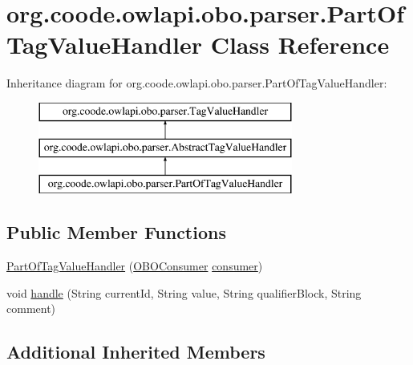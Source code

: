\hypertarget{classorg_1_1coode_1_1owlapi_1_1obo_1_1parser_1_1_part_of_tag_value_handler}{\section{org.\-coode.\-owlapi.\-obo.\-parser.\-Part\-Of\-Tag\-Value\-Handler Class Reference}
\label{classorg_1_1coode_1_1owlapi_1_1obo_1_1parser_1_1_part_of_tag_value_handler}
}
Inheritance diagram for org.\-coode.\-owlapi.\-obo.\-parser.\-Part\-Of\-Tag\-Value\-Handler\-:\begin{figure}[H]
\begin{center}
\leavevmode
\includegraphics[height=3.000000cm]{classorg_1_1coode_1_1owlapi_1_1obo_1_1parser_1_1_part_of_tag_value_handler}
\end{center}
\end{figure}
\subsection*{Public Member Functions}
\begin{DoxyCompactItemize}
\item 
\hyperlink{classorg_1_1coode_1_1owlapi_1_1obo_1_1parser_1_1_part_of_tag_value_handler_a17c1029a820aecf43990e10ed0136d07}{Part\-Of\-Tag\-Value\-Handler} (\hyperlink{classorg_1_1coode_1_1owlapi_1_1obo_1_1parser_1_1_o_b_o_consumer}{O\-B\-O\-Consumer} \hyperlink{classorg_1_1coode_1_1owlapi_1_1obo_1_1parser_1_1_abstract_tag_value_handler_ab27f1ff22d15640c5f81585f18265137}{consumer})
\item 
void \hyperlink{classorg_1_1coode_1_1owlapi_1_1obo_1_1parser_1_1_part_of_tag_value_handler_a492b4816fd23a3c3635e6c4d55f093f2}{handle} (String current\-Id, String value, String qualifier\-Block, String comment)
\end{DoxyCompactItemize}
\subsection*{Additional Inherited Members}


